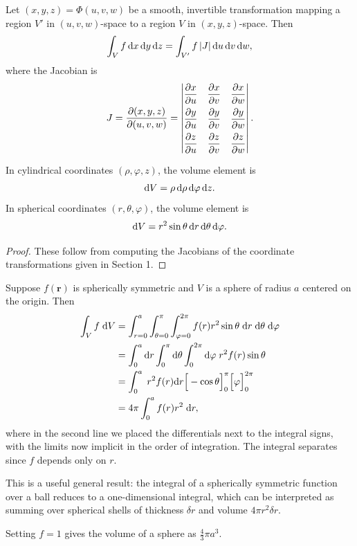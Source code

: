 \documentclass[a4paper]{article}
\begin{document}
\begin{thm}
  Let $(x, y, z) = \Phi(u, v, w)$ be a smooth, invertible transformation mapping a region $V'$ in $(u, v, w)$-space to a region $V$ in $(x, y, z)$-space. Then
  \[
    \int_V f \, \mathrm{d} x \, \mathrm{d} y \, \mathrm{d} z = \int_{V'} f \, |J| \, \mathrm{d} u \, \mathrm{d} v \, \mathrm{d} w,
  \]
  where the Jacobian is
  \[
    J = \frac{\partial(x, y, z)}{\partial(u, v, w)} =
    \begin{vmatrix}
      \dfrac{\partial x}{\partial u} & \dfrac{\partial x}{\partial v} & \dfrac{\partial x}{\partial w} \vspace{5pt}\\
      \dfrac{\partial y}{\partial u} & \dfrac{\partial y}{\partial v} & \dfrac{\partial y}{\partial w} \vspace{5pt}\\
      \dfrac{\partial z}{\partial u} & \dfrac{\partial z}{\partial v} & \dfrac{\partial z}{\partial w}
    \end{vmatrix}.
  \]
\end{thm}

\begin{prop}
  In cylindrical coordinates $(\rho, \varphi, z)$, the volume element is
  \[
    \mathrm{d} V = \rho \, \mathrm{d}\rho \, \mathrm{d}\varphi \, \mathrm{d} z.
  \]
  In spherical coordinates $(r, \theta, \varphi)$, the volume element is
  \[
    \mathrm{d} V = r^2 \sin\theta \, \mathrm{d} r \, \mathrm{d}\theta \, \mathrm{d}\varphi.
  \]
\end{prop}

\begin{proof}
  These follow from computing the Jacobians of the coordinate transformations given in Section 1.
\end{proof}

\begin{eg}
  Suppose $f(\mathbf{r})$ is spherically symmetric and $V$ is a sphere of radius $a$ centered on the origin. Then
  \begin{align*}
    \int_V f\;\mathrm{d} V &= \int_{r = 0}^a \int_{\theta = 0}^\pi \int_{\varphi = 0}^{2\pi} f(r)r^2 \sin\theta\;\mathrm{d} r\;\mathrm{d} \theta\;\mathrm{d}\varphi\\
    &= \int_0^a \mathrm{d} r\int_0^\pi \mathrm{d} \theta\int_0^{2\pi} \mathrm{d} \varphi \;r^2 f(r) \sin \theta\\
    &= \int_0^a \; r^2 f(r) \mathrm{d} r\Big[-\cos \theta\Big]_0^\pi \Big[\varphi\Big]_0^{2\pi}\\
    &= 4\pi\int_0^a f(r)r^2 \;\mathrm{d} r,
  \end{align*}
  where in the second line we placed the differentials next to the integral signs, with the limits now implicit in the order of integration. The integral separates since $f$ depends only on $r$.

  This is a useful general result: the integral of a spherically symmetric function over a ball reduces to a one-dimensional integral, which can be interpreted as summing over spherical shells of thickness $\delta r$ and volume $4\pi r^2 \delta r$.

  Setting $f = 1$ gives the volume of a sphere as $\frac{4}{3}\pi a^3$.
\end{eg}
\end{document}
